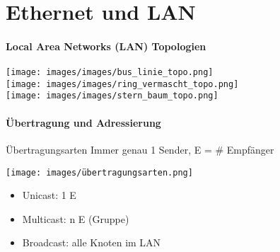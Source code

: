 \section{Ethernet und LAN}
\paragraph{Local Area Networks (LAN) Topologien}

    \centering
    \texttt{[image: images/images/bus\_linie\_topo.png]}\\
    \texttt{[image: images/images/ring\_vermascht\_topo.png]}\\
    \texttt{[image: images/images/stern\_baum\_topo.png]}

\paragraph{Übertragung und Adressierung}

\begin{definition}{Übertragungsarten}
    Immer genau 1 Sender, E = \# Empfänger
    
    \begin{minipage}{0.35\linewidth}
        \texttt{[image: images/übertragungsarten.png]}
    \end{minipage}
    \begin{minipage}{0.6\linewidth}
        \begin{itemize}
            \item Unicast: 1 E 
            \item Multicast: n E (Gruppe)
            \item Broadcast: alle Knoten im LAN
        \end{itemize}
    \end{minipage}
\end{definition}


